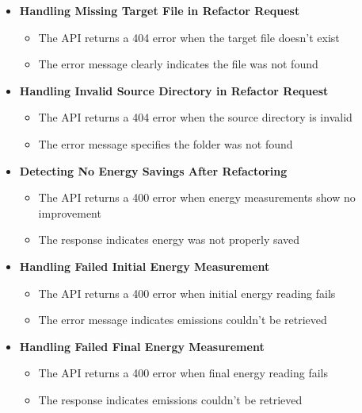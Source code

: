 \documentclass[12pt, titlepage]{article}
\begin{document}
  \begin{itemize}
    \item \textbf{Handling Missing Target File in Refactor Request}
        \begin{itemize}
            \item The API returns a 404 error when the target file doesn't exist
            \item The error message clearly indicates the file was not found
        \end{itemize}

    \item \textbf{Handling Invalid Source Directory in Refactor Request}
        \begin{itemize}
            \item The API returns a 404 error when the source directory is invalid
            \item The error message specifies the folder was not found
        \end{itemize}

    \item \textbf{Detecting No Energy Savings After Refactoring}
        \begin{itemize}
            \item The API returns a 400 error when energy measurements show no improvement
            \item The response indicates energy was not properly saved
        \end{itemize}

    \item \textbf{Handling Failed Initial Energy Measurement}
        \begin{itemize}
            \item The API returns a 400 error when initial energy reading fails
            \item The error message indicates emissions couldn't be retrieved
        \end{itemize}

    \item \textbf{Handling Failed Final Energy Measurement}
        \begin{itemize}
            \item The API returns a 400 error when final energy reading fails
            \item The response indicates emissions couldn't be retrieved
        \end{itemize}


\end{itemize}
\end{document}
